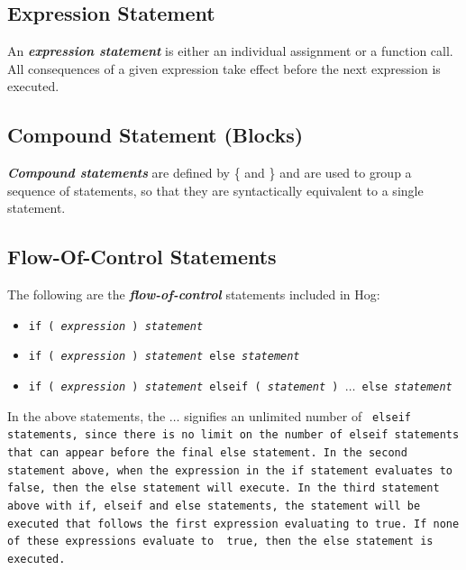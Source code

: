 \documentclass{book}
\begin{document}
\subsection{Expression Statement} %
\label{sub:expression_statement}

An \textbf{\emph{expression statement}} is either an individual assignment or a
function call. All consequences of a given expression take effect before the next
expression is executed.


\subsection{Compound Statement (Blocks)} %
\label{sub:compound_statement}

\textbf{\emph{Compound statements}} are defined by \{ and \} and are used to
group a sequence of statements, so that they are syntactically equivalent to a
single statement.


\subsection{Flow-Of-Control Statements} %
\label{sub:flow_of_control_statements}

The following are the \textbf{\emph{flow-of-control}} statements included in Hog:

\begin{itemize}
  \item[] \tt if ( \rm \emph{expression} \tt ) \rm \emph{statement}
  \item[] \tt if ( \rm \emph{expression} \tt ) \rm \emph{statement} \tt else \rm \emph{statement}
  \item[] \tt if ( \rm \emph{expression} \tt ) \rm \emph{statement} \tt elseif ( \rm \emph{statement} \tt ) $\dots$ else 
  \rm \emph{statement}
\end{itemize}

In the above statements, the  $\dots$ signifies an unlimited number of \tt
elseif \rm statements, since there is no limit on the number of \tt elseif \rm
statements that can appear before the final \tt else \rm statement. In the
second statement above, when the expression in the \tt if \rm statement
evaluates to \tt false\rm, then the \tt else \rm statement will execute. In the
third statement above with \tt if\rm, \tt elseif \rm and \tt else \rm
statements, the statement will be executed that follows the first expression
evaluating to \tt true\rm. If none of these expressions evaluate to \tt
true\rm, then the \tt else \rm statement is executed.
\end{document}
